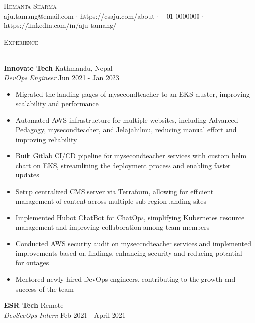 \documentclass[a4paper]{article}
\newcommand{\lineunder} {
    \vspace*{-8pt} \\
    \hspace*{-18pt} \hrulefill \\
}
\newcommand{\header} [1] {
    {\hspace*{-18pt}\vspace*{6pt} \textsc{#1}}
    \vspace*{-6pt} \lineunder
}
\begin{document}
\vspace*{-40pt}

    

\vspace*{-10pt}
\begin{center}
	{\Huge \scshape {Hemanta Sharma}}\\
	aju.tamang@email.com $\cdot$ https://csaju.com/about $\cdot$ +01 0000000 $\cdot$ https://linkedin.com/in/aju-tamang/\\
\end{center}



\header{Experience}
\vspace{1mm}

\textbf{Innovate Tech} \hfill Kathmandu, Nepal\\
\textit{DevOps Engineer} \hfill Jun 2021 - Jan 2023\\
\vspace{-1mm}
\begin{itemize} \itemsep 1pt
	\item Migrated the landing pages of mysecondteacher to an EKS cluster, improving scalability and performance
	\item Automated AWS infrastructure for multiple websites, including Advanced Pedagogy, mysecondteacher, and Jelajahilmu, reducing manual effort and improving reliability
	\item Built Gitlab CI/CD pipeline for mysecondteacher services with custom helm chart on EKS, streamlining the deployment process and enabling faster updates
	\item Setup centralized CMS server via Terraform, allowing for efficient management of content across multiple sub-region landing sites
	\item Implemented Hubot ChatBot for ChatOps, simplifying Kubernetes resource management and improving collaboration among team members
	\item Conducted AWS security audit on mysecondteacher services and implemented improvements based on findings, enhancing security and reducing potential for outages
	\item Mentored newly hired DevOps engineers, contributing to the growth and success of the team
\end{itemize}
\textbf{ESR Tech} \hfill Remote\\
\textit{DevSecOps Intern} \hfill Feb 2021 - April 2021\\
\vspace{-1mm}
\end{document}
